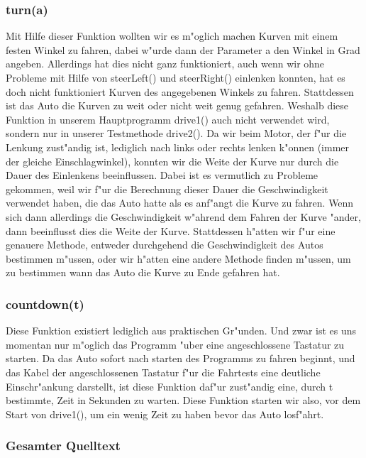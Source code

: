 \documentclass[a4paper,12pt]{article}
\begin{document}
\subsubsection{turn(a)}\label{sec2.2.6}

Mit Hilfe dieser Funktion wollten wir es m"oglich machen Kurven mit einem festen Winkel zu fahren, dabei w"urde dann der Parameter a den Winkel in Grad angeben.
Allerdings hat dies nicht ganz funktioniert, auch wenn wir ohne Probleme mit Hilfe von steerLeft() und steerRight() einlenken konnten, hat es doch nicht funktioniert Kurven des angegebenen Winkels zu fahren.
Stattdessen ist das Auto die Kurven zu weit oder nicht weit genug gefahren.
Weshalb diese Funktion in unserem Hauptprogramm drive1() auch nicht verwendet wird, sondern nur in unserer Testmethode drive2().
Da wir beim Motor, der f"ur die Lenkung zust"andig ist, lediglich nach links oder rechts lenken k"onnen (immer der gleiche Einschlagwinkel), konnten wir die Weite der Kurve nur durch die Dauer des Einlenkens beeinflussen.
Dabei ist es vermutlich zu Probleme gekommen, weil wir f"ur die Berechnung dieser Dauer die Geschwindigkeit verwendet haben, die das Auto hatte als es anf"angt die Kurve zu fahren.
Wenn sich dann allerdings die Geschwindigkeit w"ahrend dem Fahren der Kurve "ander, dann beeinflusst dies die Weite der Kurve.
Stattdessen h"atten wir f"ur eine genauere Methode, entweder durchgehend die Geschwindigkeit des Autos bestimmen m"ussen, oder wir h"atten eine andere Methode finden m"ussen, um zu bestimmen wann das Auto die Kurve zu Ende gefahren hat.

\subsubsection{countdown(t)}\label{sec2.2.7}

Diese Funktion existiert lediglich aus praktischen Gr"unden.
Und zwar ist es uns momentan nur m"oglich das Programm "uber eine angeschlossene Tastatur zu starten.
Da das Auto sofort nach starten des Programms zu fahren beginnt, und das Kabel der angeschlossenen Tastatur f"ur die Fahrtests eine deutliche Einschr"ankung darstellt, ist diese Funktion daf"ur zust"andig eine, durch t bestimmte, Zeit in Sekunden zu warten.
Diese Funktion starten wir also, vor dem Start von drive1(), um ein wenig Zeit zu haben bevor das Auto losf"ahrt.

\subsubsection{Gesamter Quelltext}\label{sec2.2.8}

\end{document}
